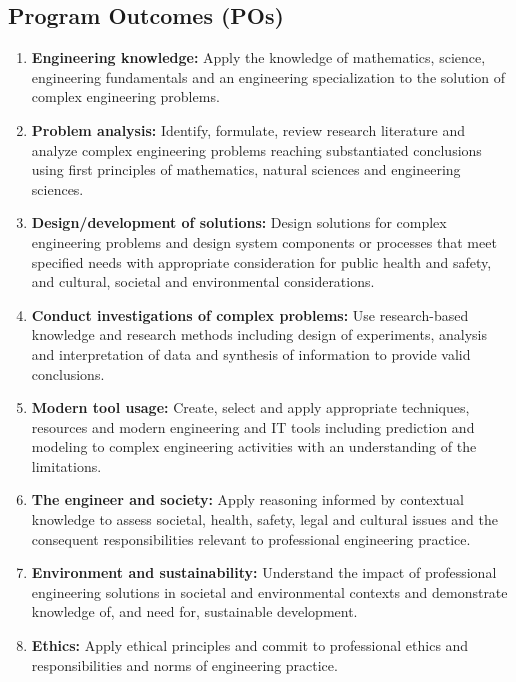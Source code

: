 \documentclass[12pt,a4paper]{report}
\begin{document}
\subsection*{Program Outcomes (POs)}
\begin{enumerate}[leftmargin=3em]
\item[\textbf{PO1:}] \textbf{Engineering knowledge:} Apply the knowledge of mathematics, science, engineering fundamentals and an engineering specialization to the solution of complex engineering problems.

\item[\textbf{PO2:}] \textbf{Problem analysis:} Identify, formulate, review research literature and analyze complex engineering problems reaching substantiated conclusions using first principles of mathematics, natural sciences and engineering sciences.

\item[\textbf{PO3:}] \textbf{Design/development of solutions:} Design solutions for complex engineering problems and design system components or processes that meet specified needs with appropriate consideration for public health and safety, and cultural, societal and environmental considerations.

\item[\textbf{PO4:}] \textbf{Conduct investigations of complex problems:} Use research-based knowledge and research methods including design of experiments, analysis and interpretation of data and synthesis of information to provide valid conclusions.

\item[\textbf{PO5:}] \textbf{Modern tool usage:} Create, select and apply appropriate techniques, resources and modern engineering and IT tools including prediction and modeling to complex engineering activities with an understanding of the limitations.

\item[\textbf{PO6:}] \textbf{The engineer and society:} Apply reasoning informed by contextual knowledge to assess societal, health, safety, legal and cultural issues and the consequent responsibilities relevant to professional engineering practice.

\item[\textbf{PO7:}] \textbf{Environment and sustainability:} Understand the impact of professional engineering solutions in societal and environmental contexts and demonstrate knowledge of, and need for, sustainable development.

\item[\textbf{PO8:}] \textbf{Ethics:} Apply ethical principles and commit to professional ethics and responsibilities and norms of engineering practice.


\end{enumerate}
\end{document}
